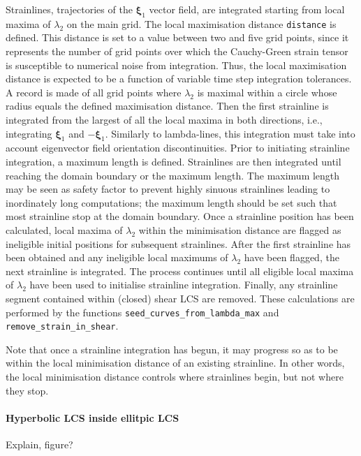 \documentclass{article}
\begin{document}
Strainlines, trajectories of the $\boldsymbol \xi_1$ vector field, are integrated starting from local maxima of $\lambda_2$ on the main grid. 
The local maximisation distance \lstinline!distance! is defined. This distance is set to a value between two and five grid points, since it represents the number of grid points over which the Cauchy-Green strain tensor is susceptible to numerical noise from integration. Thus, the local maximisation distance is expected to be a function of variable time step integration tolerances. A record is made of all grid points where $\lambda_2$ is maximal within a circle whose radius equals the defined maximisation distance. 
Then the first strainline is integrated from the largest of all the local maxima in both directions, i.e., integrating $\boldsymbol \xi_1$ and $-\boldsymbol \xi_1$. Similarly to lambda-lines, this integration must take into account eigenvector field orientation discontinuities. Prior to initiating strainline integration, a maximum length is defined. Strainlines are then integrated until reaching the domain boundary or the maximum length. The maximum length may be seen as safety factor to prevent highly sinuous strainlines leading to inordinately long computations; the maximum length should be set such that most strainline stop at the domain boundary. 
Once a strainline position has been calculated, local maxima of $\lambda_2$ within the minimisation distance are flagged as ineligible initial positions for subsequent strainlines. After the first strainline has been obtained and any ineligible local maximums of $\lambda_2$ have been flagged, the next strainline is integrated. The process continues until all eligible local maxima of $\lambda_2$ have been used to initialise strainline integration. Finally, any strainline segment contained within (closed) shear LCS are removed. These calculations are performed by the functions \lstinline!seed_curves_from_lambda_max! and \lstinline!remove_strain_in_shear!.

Note that once a strainline integration has begun, it may progress so as to be within the local minimisation distance of an existing strainline. In other words, the local minimisation distance controls where strainlines begin, but not where they stop.

\paragraph{Hyperbolic LCS inside ellitpic LCS}
Explain, figure?

\clearpage
\end{document}
